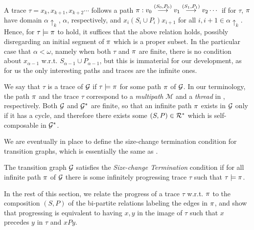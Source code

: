 \begin{remark}
A trace $\tau = x_k, x_{k+1}, x_{k+2} \cdots$ follows a path $\pi: v_0 \stackrel{(S_0,P_0)}{\longrightarrow} v_1 \stackrel{(S_1,P_1)}{\longrightarrow} v_2 \cdots$
if for $\tau$, $\pi$ have domain $\alpha\uparrow_k$, $\alpha$, respectively, 
and $x_i (S_i \cup P_i) x_{i+1}$ for all $i, i+1 \in \alpha\uparrow_k$. 
Hence, for $\tau\models\pi$ to hold, it suffices that the above relation holds, possibly disregarding an initial segment of $\pi$ which is a proper subset.
In the particular case that $\alpha < \omega$, namely when both $\tau$ and $\pi$ are finite, there is no condition about $x_{\alpha - 1}$ w.r.t. $S_{\alpha - 1} \cup P_{\alpha - 1}$, but this is immaterial for our development, 
as for us the only interesting paths and traces are the infinite ones.
\end{remark}

We say that $\tau$ is a trace of $\mathcal{G}$ if 
$\tau \models \pi$ for some path $\pi$ of $\mathcal{G}$.
In our terminology, the path $\pi$ and the trace $\tau$ correspond to a {\em multipath} $\mathcal{M}$ and a {\em thread} in \cite{Lee1}, respectively.
Both $\mathcal{G}$ and $\mathcal{G}^*$ are finite, so that an infinite path $\pi$ exists in $\mathcal{G}$ only if it has a cycle, and therefore there exists
some $(S,P) \in \mathcal{R}^*$ which is self-composable in $\mathcal{G}^*$.

We are eventually in place to define the size-change termination condition for transition graphs, which is essentially the same as \cite[Def. 2.6]{Lee3}.

\begin{definition}
\label{def:SCT}
The transition graph $\mathcal{G}$ satisfies the {\em Size-change Termination} condition 
if for all infinite path $\pi$ of $\mathcal{G}$ there is some infinitely progressing trace $\tau$ 
such that $\tau \models \pi$.
\end{definition}

In the rest of this section, we relate the progress of a trace $\tau$ w.r.t. $\pi$ 
to the composition $(S,P)$ of the bi-partite relations labeling the edges in $\pi$,
and show that progressing is equivalent to having $x, y$ in the image of $\tau$ such that $x$ precedes $y$ in $\tau$ and $x P y$.

